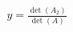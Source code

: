 \documentclass[preview]{standalone}
\begin{document}
\begin{align*}
y = \frac{\det(A_2)}{\det(A)}
\end{align*}
\end{document}
